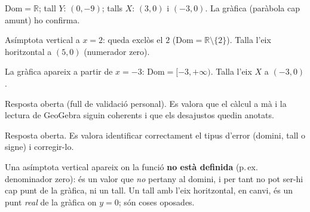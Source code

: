 \begin{solucions}
\begin{sollist}
  \item $\mathrm{Dom}=\mathbb{R}$; tall $Y$: $(0,-9)$; talls $X$: $(3,0)$ i $(-3,0)$.
        La gràfica (paràbola cap amunt) ho confirma.
  \item Asímptota vertical a $x=2$: queda exclòs el $2$
        ($\mathrm{Dom}=\mathbb{R}\setminus\{2\}$). Talla l'eix horitzontal a $(5,0)$
        (numerador zero).
  \item La gràfica apareix a partir de $x=-3$: $\mathrm{Dom}=[-3,+\infty)$. Talla
        l'eix $X$ a $(-3,0)$.
  \item Resposta oberta (full de validació personal). Es valora que el càlcul a mà i
        la lectura de GeoGebra siguin coherents i que els desajustos quedin anotats.
  \item Resposta oberta. Es valora identificar correctament el tipus d'error
        (domini, tall o signe) i corregir-lo.
  \item Una asímptota vertical apareix on la funció \textbf{no està definida} (p.\,ex.
        denominador zero): és un valor que \emph{no} pertany al domini, i per tant no
        pot ser-hi cap punt de la gràfica, ni un tall. Un tall amb l'eix horitzontal, en
        canvi, és un punt \emph{real} de la gràfica on $y=0$; són coses oposades.
\end{sollist}
\end{solucions}
